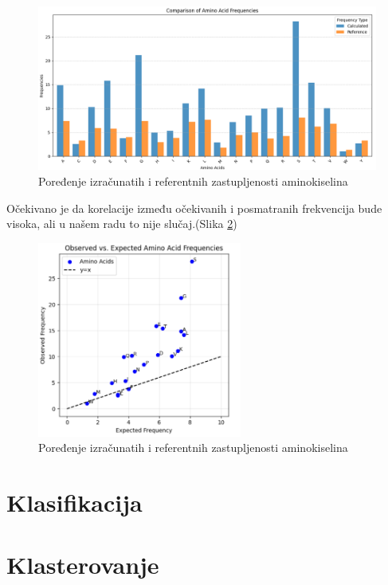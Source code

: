 \documentclass[a4paper,12pt]{article}
\begin{document}
\begin{figure}[htbp]
    \centering
    \includegraphics[width=1\textwidth]{./images/aafreq.barplot.png}
    \caption{Poređenje izračunatih i referentnih zastupljenosti aminokiselina}
    \label{Slika:aafreq.barplot}
\end{figure}

Očekivano je da korelacije između očekivanih i posmatranih frekvencija bude visoka, ali u našem radu to nije slučaj.(Slika \ref{Slika:obsvsexp})


\begin{figure}[htbp]
    \centering
    \includegraphics[width=0.6\textwidth]{./images/obsvsexp.png}
    \caption{Poređenje izračunatih i referentnih zastupljenosti aminokiselina}
    \label{Slika:obsvsexp}
\end{figure}


\newpage
\section{Klasifikacija}
\newpage
\section{Klasterovanje}
\newpage
\end{document}
